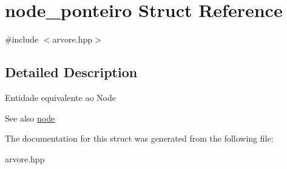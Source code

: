 \hypertarget{structnode__ponteiro}{}\section{node\+\_\+ponteiro Struct Reference}
\label{structnode__ponteiro}


{\ttfamily \#include $<$arvore.\+hpp$>$}



\subsection{Detailed Description}
Entidade equivalente ao Node \begin{DoxySeeAlso}{See also}
\hyperlink{structnode}{node} 
\end{DoxySeeAlso}


The documentation for this struct was generated from the following file\+:\begin{DoxyCompactItemize}
\item 
arvore.\+hpp\end{DoxyCompactItemize}
